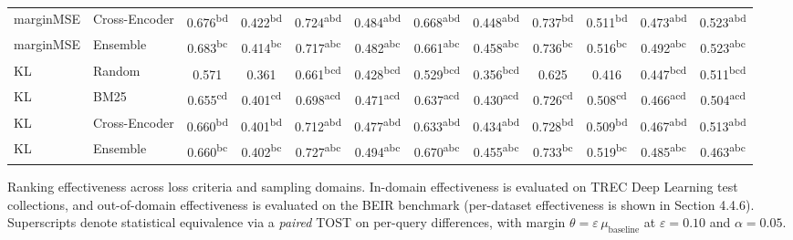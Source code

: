 \begin{table}[t]
\begin{tabular}{llcccccccccc}
  marginMSE & Cross-Encoder & 0.676\textsuperscript{bd\phantom{a}} & 0.422\textsuperscript{bd\phantom{a}} & 0.724\textsuperscript{abd\phantom{}} & 0.484\textsuperscript{abd\phantom{}} & 0.668\textsuperscript{abd\phantom{}} & 0.448\textsuperscript{abd\phantom{}} & 0.737\textsuperscript{bd\phantom{a}} & 0.511\textsuperscript{bd\phantom{a}} & 0.473\textsuperscript{abd\phantom{}} & 0.523\textsuperscript{abd\phantom{}} \\
  marginMSE & Ensemble & 0.683\textsuperscript{bc\phantom{a}} & 0.414\textsuperscript{bc\phantom{a}} & 0.717\textsuperscript{abc\phantom{}} & 0.482\textsuperscript{abc\phantom{}} & 0.661\textsuperscript{abc\phantom{}} & 0.458\textsuperscript{abc\phantom{}} & 0.736\textsuperscript{bc\phantom{a}} & 0.516\textsuperscript{bc\phantom{a}} & 0.492\textsuperscript{abc\phantom{}} & 0.523\textsuperscript{abc\phantom{}} \\
  KL & Random & 0.571\textsuperscript{\phantom{aaa}} & 0.361\textsuperscript{\phantom{aaa}} & 0.661\textsuperscript{bcd\phantom{}} & 0.428\textsuperscript{bcd\phantom{}} & 0.529\textsuperscript{bcd\phantom{}} & 0.356\textsuperscript{bcd\phantom{}} & 0.625\textsuperscript{\phantom{aaa}} & 0.416\textsuperscript{\phantom{aaa}} & 0.447\textsuperscript{bcd\phantom{}} & 0.511\textsuperscript{bcd\phantom{}} \\
  KL & BM25 & 0.655\textsuperscript{cd\phantom{a}} & 0.401\textsuperscript{cd\phantom{a}} & 0.698\textsuperscript{acd\phantom{}} & 0.471\textsuperscript{acd\phantom{}} & 0.637\textsuperscript{acd\phantom{}} & 0.430\textsuperscript{acd\phantom{}} & 0.726\textsuperscript{cd\phantom{a}} & 0.508\textsuperscript{cd\phantom{a}} & 0.466\textsuperscript{acd\phantom{}} & 0.504\textsuperscript{acd\phantom{}} \\
  KL & Cross-Encoder & 0.660\textsuperscript{bd\phantom{a}} & 0.401\textsuperscript{bd\phantom{a}} & 0.712\textsuperscript{abd\phantom{}} & 0.477\textsuperscript{abd\phantom{}} & 0.633\textsuperscript{abd\phantom{}} & 0.434\textsuperscript{abd\phantom{}} & 0.728\textsuperscript{bd\phantom{a}} & 0.509\textsuperscript{bd\phantom{a}} & 0.467\textsuperscript{abd\phantom{}} & 0.513\textsuperscript{abd\phantom{}} \\
  KL & Ensemble & 0.660\textsuperscript{bc\phantom{a}} & 0.402\textsuperscript{bc\phantom{a}} & 0.727\textsuperscript{abc\phantom{}} & 0.494\textsuperscript{abc\phantom{}} & 0.670\textsuperscript{abc\phantom{}} & 0.455\textsuperscript{abc\phantom{}} & 0.733\textsuperscript{bc\phantom{a}} & 0.519\textsuperscript{bc\phantom{a}} & 0.485\textsuperscript{abc\phantom{}} & 0.463\textsuperscript{abc\phantom{}} \\
  \bottomrule
  \end{tabular}
\end{table}
  \caption{Ranking effectiveness across loss criteria and sampling domains. In-domain effectiveness is evaluated on TREC Deep Learning test collections, and out-of-domain effectiveness is evaluated on the BEIR benchmark (per-dataset effectiveness is shown in Section 4.4.6). Superscripts denote statistical equivalence via a \emph{paired} TOST on per-query differences, with margin $\theta = \varepsilon\,\mu_{\text{baseline}}$ at $\varepsilon = 0.10$ and $\alpha = 0.05$.}
  \label{tab:ch4-main-results}
